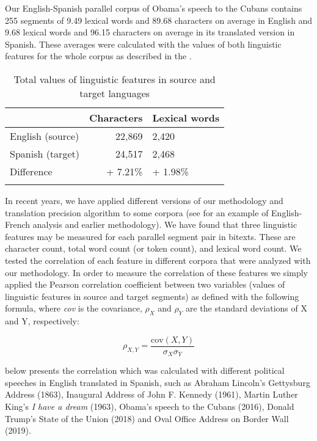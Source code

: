 \documentclass[output=paper]{langsci/langscibook}
\begin{document}
Our English-Spanish parallel corpus of Obama's speech to the Cubans contains 255 segments of 9.49 lexical words and 89.68 characters on average in English and 9.68 lexical words and 96.15 characters on average in its translated version in Spanish. These averages were calculated with the values of both linguistic features for the whole corpus as described in the .

\begin{table}\caption{Total values of linguistic features in source and target languages}\label{ep:t1}
  \begin{tabularx}{\textwidth}{XrY}
    \lsptoprule
                      & \textbf{Characters} & \textbf{Lexical words}\\
    \midrule
    English (source)  & 22,869              & 2,420\\
    Spanish (target)  & 24,517              & 2,468\\
    Difference        & + 7.21\%            & + 1.98\%\\
    \lspbottomrule
  \end{tabularx}
\end{table}

In recent years, we have applied different versions of our methodology and translation precision algorithm to some corpora (see \textcite{poirier19} for an example of English-French analysis and earlier methodology). We have found that three linguistic features may be measured for each parallel segment pair in bitexts. These are character count, total word count (or token count), and lexical word count. We tested the correlation of each feature in different corpora that were analyzed with our methodology. In order to measure the correlation of these features we simply applied the Pearson correlation coefficient between two variables (values of linguistic features in source and target segments) as defined with the following formula, where \textit{cov} is the covariance, $\rho_{X}$ and $\rho_{Y}$ are the standard deviations of X and Y, respectively:

\[
  \rho_{X,Y}=\frac{\text{cov}(X,Y)}{\sigma_{X}\sigma_{Y}}
\]

 below presents the correlation which was calculated with different political speeches in English translated in Spanish, such as Abraham Lincoln’s Gettysburg Address (1863), Inaugural Address of John F. Kennedy (1961), Martin Luther King’s \textit{I have a dream} (1963), Obama’s speech to the Cubans (2016), Donald Trump’s State of the Union (2018) and Oval Office Address on Border Wall (2019).
\end{document}
